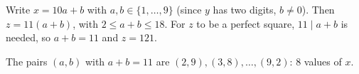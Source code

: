 Write $x=10a+b$ with $a,b\in\{1,\dots,9\}$ (since $y$ has two digits, $b\ne0$). Then $z=11(a+b)$, with $2\le a+b\le18$. For $z$ to be a perfect square, $11\mid a+b$ is needed, so $a+b=11$ and $z=121$.

The pairs $(a,b)$ with $a+b=11$ are $(2,9),(3,8),\dots,(9,2)$: $\boxed{8}$ values of $x$.
